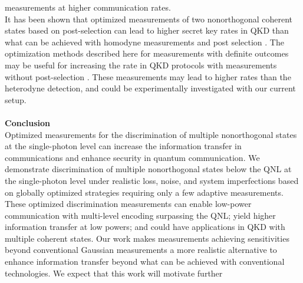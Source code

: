\documentclass[twocolumn,pra,preprintnumbers,amsmath,amssymb,superscriptaddress,floatfix]{revtex4}%
\begin{document}
measurements at higher communication rates.
\\
It has been shown \cite{wittmann10} that optimized measurements of two nonorthogonal coherent states based on post-selection can lead to higher secret key rates in QKD than what can be achieved with homodyne measurements and post selection \cite{heid06, sych16}. The optimization methods described here for measurements with definite outcomes may be useful for increasing the rate in QKD protocols with measurements without post-selection \cite{heid06, sych16}. These measurements may lead to higher rates than the heterodyne detection, and could be experimentally investigated with our current setup.
\\
\\
\textbf{Conclusion}
\\Optimized measurements for the discrimination
of multiple nonorthogonal states at the single-photon level can increase the
information transfer in communications and enhance security in
quantum communication. We demonstrate discrimination of multiple
nonorthogonal states below the QNL at the single-photon level under
realistic loss, noise, and system imperfections based on globally optimized
strategies requiring only a few adaptive measurements. These
optimized discrimination measurements can enable low-power
communication with multi-level encoding surpassing the QNL; yield
higher information transfer at low powers; and could have applications
in QKD with multiple coherent states. Our work
makes measurements achieving sensitivities beyond conventional
Gaussian measurements a more realistic alternative to enhance
information transfer beyond what can be achieved with conventional
technologies. We expect that this work will motivate further
\end{document}
